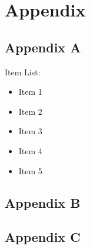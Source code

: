 \section{Appendix}
\subsection{Appendix A}
Item List:
\begin{itemize}
    \item Item 1
    \item Item 2
    \item Item 3
    \item Item 4
    \item Item 5
\end{itemize}

\subsection{Appendix B}


\subsection{Appendix C}
